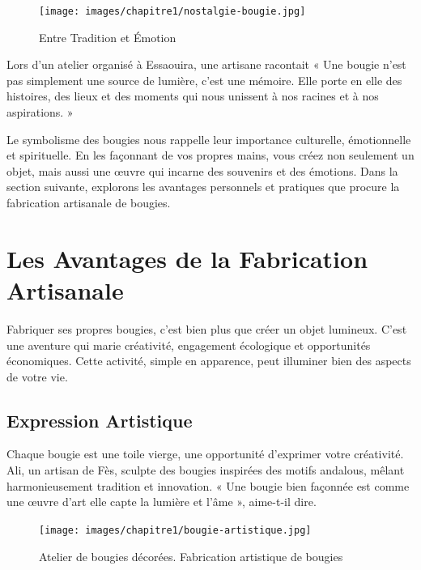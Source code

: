 \documentclass[11pt,fleqn,onecolumn,oneside]{book}
\begin{document}
\begin{figure}[htbp]
    \centering
    \texttt{[image: images/chapitre1/nostalgie-bougie.jpg]}
    \caption{Entre Tradition et Émotion}
    \label{fig:image_bougie_tradition_emotion}
\end{figure}


\begin{example} Lors d’un atelier organisé à Essaouira, une artisane racontait « Une bougie n’est pas simplement une source de lumière, c’est une mémoire. Elle porte en elle des histoires, des lieux et des moments qui nous unissent à nos racines et à nos aspirations. » \end{example}

\begin{remark} Le symbolisme des bougies nous rappelle leur importance culturelle, émotionnelle et spirituelle. En les façonnant de vos propres mains, vous créez non seulement un objet, mais aussi une œuvre qui incarne des souvenirs et des émotions. Dans la section suivante, explorons les avantages personnels et pratiques que procure la fabrication artisanale de bougies. \end{remark}

\section{Les Avantages de la Fabrication Artisanale}

\begin{definition}
Fabriquer ses propres bougies, c’est bien plus que créer un objet lumineux. C’est une aventure qui marie créativité, engagement écologique et opportunités économiques. Cette activité, simple en apparence, peut illuminer bien des aspects de votre vie.
\end{definition}

\subsection*{Expression Artistique}

\begin{remark}
Chaque bougie est une toile vierge, une opportunité d’exprimer votre créativité. Ali, un artisan de Fès, sculpte des bougies inspirées des motifs andalous, mêlant harmonieusement tradition et innovation. « Une bougie bien façonnée est comme une œuvre d’art elle capte la lumière et l’âme », aime-t-il dire.
\end{remark}

\begin{figure}[htbp]
    \centering
    \texttt{[image: images/chapitre1/bougie-artistique.jpg]}
    \caption{Atelier de bougies décorées. Fabrication artistique de bougies}
    \label{fig:image_bougie_art}
\end{figure}
\end{document}
